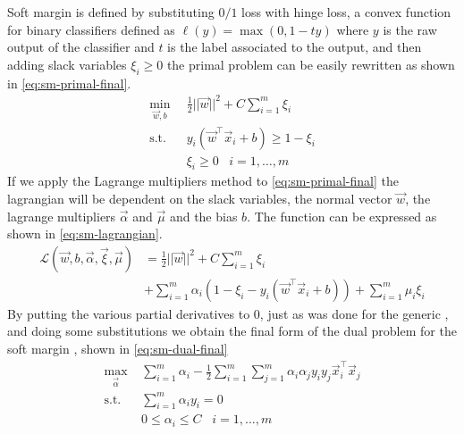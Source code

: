 Soft margin \svm is defined by substituting $0/1$ loss with hinge loss, a convex function for binary
classifiers defined as $\ell(y) = \max(0, 1 - ty)$ where $y$ is the raw output of the classifier and
$t$ is the label associated to the output, and then adding slack variables $\xi_i \geq 0$ the primal problem can be easily rewritten as shown in \cref{eq:sm-primal-final}.
\begin{equation}
	\label{eq:sm-primal-final}
	\begin{aligned}
		\min_{\vec{w}, b} & \frac{1}{2}||\vec{w}||^2 + C\sum_{i = 1}^m \xi_i \\
		\text{s.t.} \hspace{10pt}& y_i(\vec{w}^\top\vec{x}_i + b) \geq 1 - \xi_i \\
		& \xi_i \geq 0 \hspace{10pt}i = 1, \ldots, m
	\end{aligned}
\end{equation}
If we apply the Lagrange multipliers method to \cref{eq:sm-primal-final} the lagrangian will be
dependent on the slack variables, the normal vector $\vec{w}$, the lagrange multipliers
$\vec{\alpha}$ and $\vec{\mu}$ and the bias $b$. The function can be expressed as shown in
\cref{eq:sm-lagrangian}.
\begin{equation}
	\label{eq:sm-lagrangian}
	\begin{aligned}
		\mathcal{L}(\vec{w}, b, \vec{\alpha}, \vec{\xi}, \vec{\mu}) &=
		\frac{1}{2}||\vec{w}||^2 + C\sum_{i = 1}^m \xi_i \\ 
		&+ \sum_{i = 1}^m \alpha_i(1 - \xi_i - y_i(\vec{w}^\top\vec{x}_i + b)) + \sum_{i = 1}^m\mu_i\xi_i
	\end{aligned}
\end{equation}
By putting the various partial derivatives to $0$, just as was done for the generic \svm, and doing
some substitutions we obtain the final form of the dual problem for the soft margin \svm, shown in
\cref{eq:sm-dual-final}
\begin{equation}
	\label{eq:sm-dual=final}
	\begin{aligned}
		\max_{\vec{\alpha}} & \sum_{i = 1}^m \alpha_i - \frac{1}{2}\sum_{i = 1}^m\sum_{j =
		1}^m\alpha_i\alpha_jy_iy_j\vec{x}_i^\top\vec{x}_j \\
		\text{s.t.} \hspace{10pt} & \sum_{i = 1}^m\alpha_iy_i = 0 \\
		& 0 \leq \alpha_i \leq C \hspace{10pt} i = 1, \ldots, m
	\end{aligned}
\end{equation}
